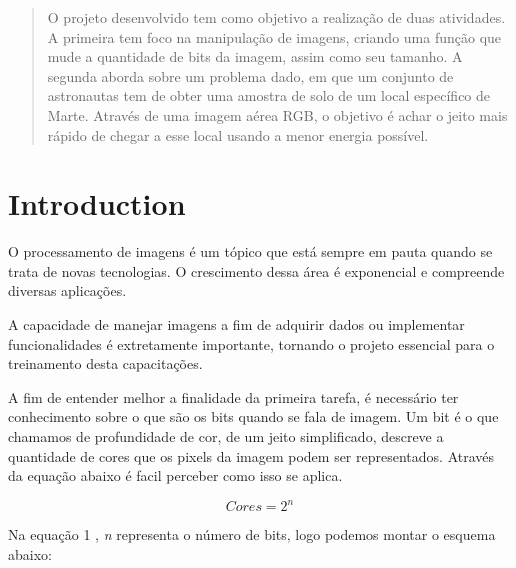 \documentclass[conference]{IEEEtran}
\begin{document}
\begin{abstract}
O projeto desenvolvido tem como objetivo a realização de duas atividades.
A primeira tem foco na manipulação de imagens, criando uma função que mude a
quantidade de bits da imagem, assim como seu tamanho. A segunda aborda sobre
um problema dado, em que um conjunto de astronautas tem de obter uma amostra de 
solo de um local específico de Marte. Através de uma imagem aérea RGB, o objetivo
é achar o jeito mais rápido de chegar a esse local usando a menor energia possível.
\end{abstract}





%
\IEEEpeerreviewmaketitle



\section{Introduction}
O processamento de imagens é um tópico que está sempre em pauta quando se
trata de novas tecnologias. O crescimento dessa área é exponencial e compreende
diversas aplicações. 

A capacidade de manejar imagens a fim de adquirir dados ou implementar funcionalidades
é extretamente importante, tornando o projeto essencial para o treinamento
desta capacitações.

A fim de entender melhor a finalidade da primeira tarefa, é necessário
ter conhecimento sobre o que são os bits quando se fala de imagem. Um bit é o que chamamos
de profundidade de cor, de um jeito simplificado, descreve a quantidade de 
cores que os pixels da imagem podem ser representados. Através da equação abaixo
é facil perceber como isso se aplica.

\begin{equation}\label{eq1}
    Cores = 2^n
\end{equation}

Na equação 1 ,  \textit{n} representa o número de bits, logo podemos montar o esquema abaixo:
\end{document}
